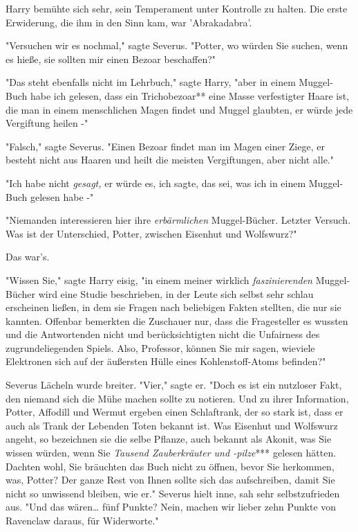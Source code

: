 {Harry bemühte sich sehr, sein Temperament unter Kontrolle zu halten. Die erste Erwiderung, die ihm in den Sinn kam, war 'Abrakadabra'.

"Versuchen wir es nochmal," sagte Severus. "Potter, wo würden Sie suchen, wenn es hieße, sie sollten mir einen Bezoar beschaffen?"

"Das steht ebenfalls nicht im Lehrbuch," sagte Harry, "aber in einem Muggel-Buch habe ich gelesen, dass ein Trichobezoar** eine Masse verfestigter Haare ist, die man in einem menschlichen Magen findet und Muggel glaubten, er würde jede Vergiftung heilen -"

"Falsch," sagte Severus. "Einen Bezoar findet man im Magen einer Ziege, er besteht nicht aus Haaren und heilt die meisten Vergiftungen, aber nicht alle."

"Ich habe nicht \emph{gesagt,} er würde es, ich sagte, das sei, was ich in einem Muggel-Buch gelesen habe -"

"Niemanden interessieren hier ihre \emph{erbärmlichen} Muggel-Bücher. Letzter Versuch. Was ist der Unterschied, Potter, zwischen Eisenhut und Wolfswurz?"

Das war's.

"Wissen Sie," sagte Harry eisig, "in einem meiner wirklich \emph{faszinierenden} Muggel-Bücher wird eine Studie beschrieben, in der Leute sich selbst sehr schlau erscheinen ließen, in dem sie Fragen nach beliebigen Fakten stellten, die nur sie kannten. Offenbar bemerkten die Zuschauer nur, dass die Fragesteller es wussten und die Antwortenden nicht und berücksichtigten nicht die Unfairness des zugrundeliegenden Spiels. Also, Professor, können Sie mir sagen, wieviele Elektronen sich auf der äußersten Hülle eines Kohlenstoff-Atoms befinden?"

Severus Lächeln wurde breiter. "Vier," sagte er. "Doch es ist ein nutzloser Fakt, den niemand sich die Mühe machen sollte zu notieren. Und zu ihrer Information, Potter, Affodill und Wermut ergeben einen Schlaftrank, der so stark ist, dass er auch als Trank der Lebenden Toten bekannt ist. Was Eisenhut und Wolfswurz angeht, so bezeichnen sie die selbe Pflanze, auch bekannt als Akonit, was Sie wissen würden, wenn Sie \emph{Tausend Zauberkräuter und -pilze}*** gelesen hätten. Dachten wohl, Sie bräuchten das Buch nicht zu öffnen, bevor Sie herkommen, was, Potter? Der ganze Rest von Ihnen sollte sich das aufschreiben, damit Sie nicht so unwissend bleiben, wie er." Severus hielt inne, sah sehr selbstzufrieden aus. "Und das wären… fünf Punkte? Nein, machen wir lieber zehn Punkte von Ravenclaw daraus, für Widerworte."

}
